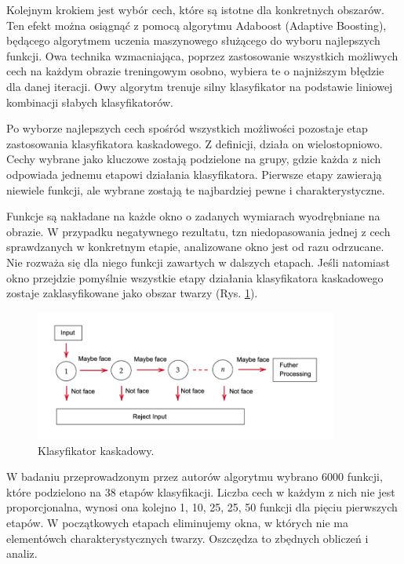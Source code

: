 Kolejnym krokiem jest wybór cech, które są istotne dla konkretnych obszarów. Ten efekt można osiągnąć z pomocą algorytmu Adaboost (Adaptive Boosting), będącego algorytmem uczenia maszynowego służącego do wyboru najlepszych funkcji. Owa technika wzmacniająca, poprzez zastosowanie wszystkich możliwych cech na każdym obrazie treningowym osobno, wybiera te o najniższym błędzie dla danej iteracji. Owy algorytm trenuje silny klasyfikator na podstawie liniowej kombinacji słabych klasyfikatorów.%
 
Po wyborze najlepszych cech spośród wszystkich możliwości pozostaje etap zastosowania klasyfikatora kaskadowego. Z definicji, działa on wielostopniowo. Cechy wybrane jako kluczowe zostają podzielone na grupy, gdzie każda z nich odpowiada jednemu etapowi działania klasyfikatora. Pierwsze etapy zawierają niewiele funkcji, ale wybrane zostają te najbardziej pewne i charakterystyczne. 
 
Funkcje są nakładane na każde okno o zadanych wymiarach wyodrębniane na obrazie. W przypadku negatywnego rezultatu, tzn niedopasowania jednej z cech sprawdzanych w konkretnym etapie, analizowane okno jest od razu odrzucane. Nie rozważa się dla niego funkcji zawartych w dalszych etapach. Jeśli natomiast okno przejdzie pomyślnie wszystkie etapy działania klasyfikatora kaskadowego zostaje zaklasyfikowane jako obszar twarzy (Rys. \ref{fig:cascadeClasificator}).  
 
\begin{figure}[h]
	\centering
	\includegraphics[width=10cm]{haar_train.png}
	\caption{Klasyfikator kaskadowy. \cite{haarCascade}} 
	\label{fig:cascadeClasificator}
\end{figure}

W badaniu przeprowadzonym przez autorów algorytmu wybrano 6000 funkcji, które podzielono na 38 etapów klasyfikacji. Liczba cech w każdym z nich nie jest proporcjonalna, wynosi ona kolejno 1, 10, 25, 25, 50 funkcji dla pięciu pierwszych etapów. W początkowych etapach eliminujemy okna, w których nie ma elementówch charakterystycznych twarzy. Oszczędza to zbędnych obliczeń i analiz.

